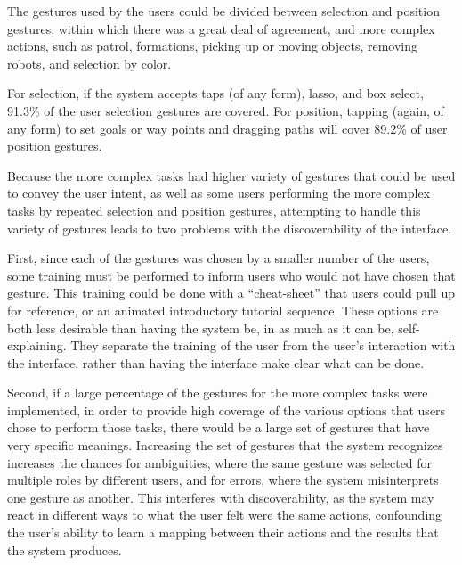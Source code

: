 The gestures used by the users could be divided between selection and position gestures, within which there was a great deal of agreement, and more complex actions, such as patrol, formations, picking up or moving objects, removing robots, and selection by color. 

For selection, if the system accepts taps (of any form), lasso, and box select, 91.3\% of the user selection gestures are covered. For position, tapping (again, of any form) to set goals or way points and dragging paths will cover 89.2\% of user position gestures.

Because the more complex tasks had higher variety of gestures that could be used to convey the user intent, as well as some users performing the more complex tasks by repeated selection and position gestures, attempting to handle this variety of gestures leads to two problems with the discoverability of the interface. 

First, since each of the gestures was chosen by a smaller number of the users, some training must be performed to inform users who would not have chosen that gesture. 
This training could be done with a ``cheat-sheet'' that users could pull up for reference, or an animated introductory tutorial sequence. 
These options are both less desirable than having the system be, in as much as it can be, self-explaining. 
They separate the training of the user from the user's interaction with the interface, rather than having the interface make clear what can be done.

Second, if a large percentage of the gestures for the more complex tasks were implemented, in order to provide high coverage of the various options that users chose to perform those tasks, there would be a large set of gestures that have very specific meanings. 
Increasing the set of gestures that the system recognizes increases the chances for ambiguities, where the same gesture was selected for multiple roles by different users, and for errors, where the system misinterprets one gesture as another. 
This interferes with discoverability, as the system may react in different ways to what the user felt were the same actions, confounding the user's ability to learn a mapping between their actions and the results that the system produces. 

